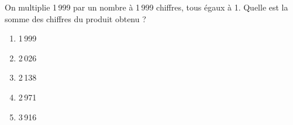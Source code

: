 On multiplie 1\,999 par un nombre à 1\,999 chiffres, tous égaux à 1. Quelle est la somme des chiffres du produit obtenu ?
\begin{multicols}{5}
  \begin{enumerate}[A/]
  \item 1\,999
  \item 2\,026
  \item 2\,138
  \item 2\,971
  \item 3\,916
  \end{enumerate}
\end{multicols}